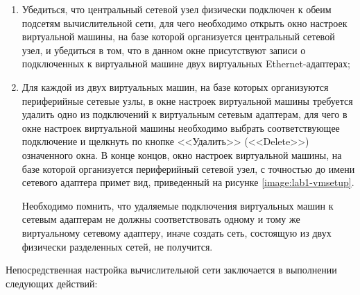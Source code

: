 	\begin{enumerate}

		\item Убедиться, что центральный сетевой узел физически подключен к обеим подсетям вычислительной сети,
		для чего необходимо открыть окно настроек виртуальной машины, на базе которой организуется
		центральный сетевой узел, и убедиться в том, что в данном окне присутствуют записи о
		подключенных к виртуальной машине двух виртуальных Ethernet-адаптерах;

		\item Для каждой из двух виртуальных машин, на базе которых организуются периферийные сетевые узлы,
		в окне настроек виртуальной машины требуется удалить одно из подключений к виртуальным сетевым адаптерам,
		для чего в окне настроек виртуальной машины необходимо выбрать
		соответствующее подключение и щелкнуть по кнопке <<Удалить>> (<<Delete>>) означенного окна.
		В конце концов, окно настроек виртуальной машины, на базе которой организуется периферийный сетевой узел,
		с точностью до имени сетевого адаптера примет вид, приведенный на рисунке \ref{image:lab1-vmsetup}.

		Необходимо помнить, что удаляемые подключения виртуальных машин к сетевым адаптерам
		не должны соответствовать одному и тому же виртуальному сетевому адаптеру,
		иначе создать сеть, состоящую из двух физически разделенных сетей, не получится.


	\end{enumerate}

	Непосредственная настройка вычислительной сети заключается в выполнении следующих действий:

